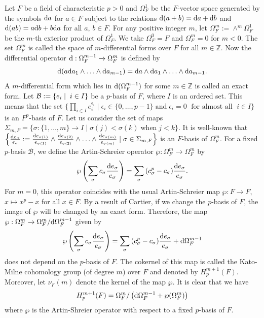 \documentclass[times,10pt]{amsart}
\newcommand{\Z}{\ensuremath{\mathbb{Z}}}
\newcommand{\dd}{{\rm d}}
\begin{document}
      {Let $F$ be a field of characteristic $p>0$ and $\Omega_F^1$ be the $F$-vector space generated by the symbols $\dd a$ for $a\in F$ subject to the relations $\dd (a+b)= \dd a+ \dd b$ and $\dd(ab)= a\dd b+b\dd a$ for all  $a$, $b\in F$. For any positive integer $m$, let $\Omega_F^m:= \wedge^m\Omega_F^1$ be the $m$-th exterior product of $\Omega_F^1$. {We take $\Omega_F^0=F$ and $\Omega_F^{m}=0$ for $m<0$}. The  set $\Omega_F^m$ is called the space of $m$-differential forms over $F$  for all $m\in \Z$.  
Now  the differential operator $\dd: \Omega_F^{m-1}\xrightarrow{} \Omega_F^m$ is defined by  $$  \dd ( a\dd a_1\wedge\ldots\wedge \dd a_{m-1})= \dd a\wedge \dd a_1\wedge \ldots\wedge \dd a_{m-1}.$$ 
{A} $m$-differential form which lies in $\dd(\Omega_F^{m-1})$ for some $m\in \Z$ is called an exact form. Let $ \mathcal{B}:=\{e_i\mid\hspace{1mm} i\in I\}$ be a {$p$-basis} of $F$, where  $I$ is an ordered set. {This means that the set $\big\{\prod_{i\in I}e_i^{\epsilon_i}\mid \epsilon_i\in {\{0,\ldots,p-1\}}\; \text{and}\;\epsilon_i=0\;\text{ for almost all }\; i\in I\big\}$ is an {$F^p$-basis} of $F$}.  Let us consider the set of maps  $\Sigma_{m,F}=\{ \sigma: \{1,\ldots,m\}\xrightarrow{}I \mid \sigma(j)<\sigma(k)\; \text{when}\;j<k \}.$ It is well-known  that $\left\{\frac{\dd e_{\sigma}}{e_{\sigma}}:= \frac{\dd e_{\sigma(1)}}{e_{\sigma(1)}}\wedge \frac{\mathrm{d}e_{\sigma(2)}}{e_{\sigma(2)}}\wedge \ldots \wedge \frac{\mathrm{d}e_{\sigma(m)}}{e_{\sigma(m)}} \mid  \sigma\in \Sigma_{m,F}\right\}$ is an $F$-basis of $\Omega_F^m$.   For a fixed {$p$-basis} $\mathcal{B}$, we define the Artin-Schreier operator  $\wp: \Omega_F^m\xrightarrow{} \Omega_F^m$ by $$ \wp\left(  \sum_{\sigma} c_{\sigma} \frac{\dd e_{\sigma}}{e_{\sigma}}\right)= \sum_{\sigma} {(c^p_{\sigma}-c_{\sigma})} \frac{\dd e_{\sigma}}{e_{\sigma}}.$$ 
For $m=0$,  {this operator coincides with the usual} Artin-Schreier map $ \wp: F\xrightarrow{}F$,  {$x\mapsto x^p-x$} for all $x\in F$.
By a result of Cartier, if we change the {$p$-basis} of $F$, the image of $\wp$ will be changed by an exact form.  Therefore,  the  map $\wp: \Omega_F^m\xrightarrow{} \Omega_F^m/{\dd \Omega_F^{m-1}}$ given by  $$ \wp\left(  \sum_{\sigma} c_{\sigma} \frac{\dd e_{\sigma}}{e_{\sigma}}\right)= \sum_{\sigma} {(c^p_{\sigma}-c_{\sigma})} \frac{\dd e_{\sigma}}{e_{\sigma}}+\dd \Omega_F^{m-1} $$does not depend on the {$p$-basis} of $F$.  The cokernel of this map  is  called the  Kato-Milne cohomology group (of degree $m$) over $F$ and  denoted by ${H_p^{m+1}(F)}$. {Moreover, let $\nu_F(m)$ denote the kernel of the map $\wp$. It is clear that we have$${H_p^{m+1}(F)}= {\Omega^m_F}/\left({\dd\Omega_F^{m-1}+\wp(\Omega_F^m)}\right)$$ where $\wp$ is the  Artin-Shreier operator with respect to a fixed {$p$-basis} of $F$.} }
\end{document}
